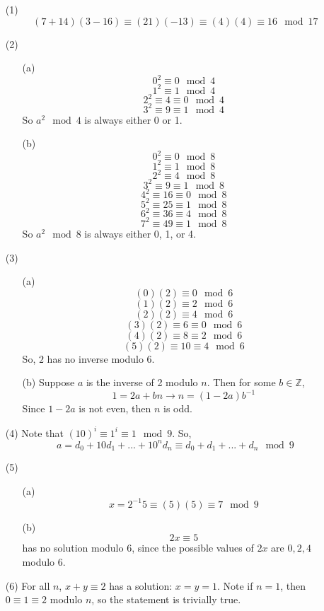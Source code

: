 %
%
\begin{itemize}
\item[(1)]
$$(7 + 14)(3 - 16)\equiv (21)(-13) \equiv (4)(4) \equiv 16 \mod 17$$
\item[(2)]
\begin{itemize}
\item[(a)]
$$0^2 \equiv 0 \mod 4$$
$$1^2 \equiv 1 \mod 4$$
$$2^2 \equiv 4 \equiv 0 \mod 4$$
$$3^2 \equiv 9 \equiv 1 \mod 4$$
So $a^2 \mod 4$ is always either 0 or 1.
\item[(b)]
$$0^2 \equiv 0 \mod 8$$
$$1^2 \equiv 1 \mod 8$$
$$2^2 \equiv 4 \mod 8$$
$$3^2 \equiv 9 \equiv 1 \mod 8$$
$$4^2 \equiv 16 \equiv 0 \mod 8$$
$$5^2 \equiv 25 \equiv 1 \mod 8$$
$$6^2 \equiv 36 \equiv 4 \mod 8$$
$$7^2 \equiv 49 \equiv 1 \mod 8$$
So $a^2 \mod 8$ is always either 0, 1, or 4.
\end{itemize}
\item[(3)]
\begin{itemize}
\item[(a)]
$$(0)(2) \equiv 0 \mod 6$$
$$(1)(2) \equiv 2 \mod 6$$
$$(2)(2) \equiv 4 \mod 6$$
$$(3)(2) \equiv 6 \equiv 0 \mod 6$$
$$(4)(2) \equiv 8 \equiv 2 \mod 6$$
$$(5)(2) \equiv 10 \equiv 4 \mod 6$$
So, $2$ has no inverse modulo 6.
\item[(b)]
Suppose $a$ is the inverse of 2 modulo $n$. Then for some $b \in \mathbb{Z}$,
$$1 = 2a + bn \rightarrow n = (1 - 2a)b^{-1}$$
Since $1 - 2a$ is not even, then $n$ is odd.
\end{itemize}
\item[(4)]
Note that $(10)^i \equiv 1^i \equiv 1 \mod 9$. So,
$$a = d_0 + 10d_1 + ... + 10^nd_n \equiv d_0 + d_1 + ... + d_n \mod 9$$
\item[(5)]
\begin{itemize}
\item[(a)]
$$x = 2^{-1}5 \equiv (5)(5) \equiv 7 \mod 9$$
\item[(b)]
$$2x \equiv 5$$ has no solution modulo 6, since the possible values of $2x$ are $0, 2, 4$ modulo 6.
\end{itemize}
\item[(6)]
For all $n$, $x + y \equiv 2$ has a solution: $x = y = 1$. Note if $n = 1$, then $0 \equiv 1 \equiv 2$ modulo $n$, so the statement is trivially true.


\end{itemize}

